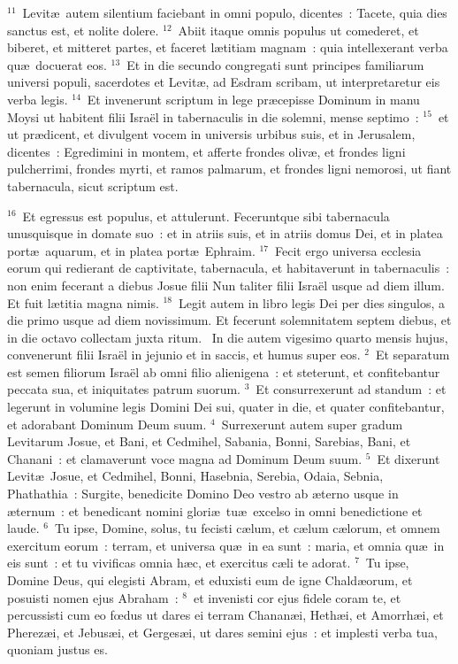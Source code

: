 ${}^{11}$~Levit\ae\ autem silentium faciebant in omni populo, dicentes~: Tacete, quia dies sanctus est, et nolite dolere.
${}^{12}$~Abiit itaque omnis populus ut comederet, et biberet, et mitteret partes, et faceret l\ae titiam magnam~: quia intellexerant verba qu\ae\ docuerat eos.
${}^{13}$~Et in die secundo congregati sunt principes familiarum universi populi, sacerdotes et Levit\ae , ad Esdram scribam, ut interpretaretur eis verba legis.
${}^{14}$~Et invenerunt scriptum in lege pr\ae cepisse Dominum in manu Moysi ut habitent filii Isra\"el in tabernaculis in die solemni, mense septimo~:
${}^{15}$~et ut pr\ae dicent, et divulgent vocem in universis urbibus suis, et in Jerusalem, dicentes~: Egredimini in montem, et afferte frondes oliv\ae , et frondes ligni pulcherrimi, frondes myrti, et ramos palmarum, et frondes ligni nemorosi, ut fiant tabernacula, sicut scriptum est.


${}^{16}$~Et egressus est populus, et attulerunt. Feceruntque sibi tabernacula unusquisque in domate suo~: et in atriis suis, et in atriis domus Dei, et in platea port\ae\ aquarum, et in platea port\ae\ Ephraim.
${}^{17}$~Fecit ergo universa ecclesia eorum qui redierant de captivitate, tabernacula, et habitaverunt in tabernaculis~: non enim fecerant a diebus Josue filii Nun taliter filii Isra\"el usque ad diem illum. Et fuit l\ae titia magna nimis.
${}^{18}$~Legit autem in libro legis Dei per dies singulos, a die primo usque ad diem novissimum. Et fecerunt solemnitatem septem diebus, et in die octavo collectam juxta ritum.
~In die autem vigesimo quarto mensis hujus, convenerunt filii Isra\"el in jejunio et in saccis, et humus super eos.
${}^{2}$~Et separatum est semen filiorum Isra\"el ab omni filio alienigena~: et steterunt, et confitebantur peccata sua, et iniquitates patrum suorum.
${}^{3}$~Et consurrexerunt ad standum~: et legerunt in volumine legis Domini Dei sui, quater in die, et quater confitebantur, et adorabant Dominum Deum suum.
${}^{4}$~Surrexerunt autem super gradum Levitarum Josue, et Bani, et Cedmihel, Sabania, Bonni, Sarebias, Bani, et Chanani~: et clamaverunt voce magna ad Dominum Deum suum.
${}^{5}$~Et dixerunt Levit\ae\ Josue, et Cedmihel, Bonni, Hasebnia, Serebia, Odaia, Sebnia, Phathathia~: Surgite, benedicite Domino Deo vestro ab \ae terno usque in \ae ternum~: et benedicant nomini glori\ae\ tu\ae\ excelso in omni benedictione et laude.
${}^{6}$~Tu ipse, Domine, solus, tu fecisti c\ae lum, et c\ae lum c\ae lorum, et omnem exercitum eorum~: terram, et universa qu\ae\ in ea sunt~: maria, et omnia qu\ae\ in eis sunt~: et tu vivificas omnia h\ae c, et exercitus c\ae li te adorat.
${}^{7}$~Tu ipse, Domine Deus, qui elegisti Abram, et eduxisti eum de igne Chald\ae orum, et posuisti nomen ejus Abraham~:
${}^{8}$~et invenisti cor ejus fidele coram te, et percussisti cum eo fœdus ut dares ei terram Chanan\ae i, Heth\ae i, et Amorrh\ae i, et Pherez\ae i, et Jebus\ae i, et Gerges\ae i, ut dares semini ejus~: et implesti verba tua, quoniam justus es.


